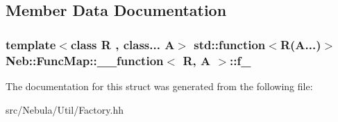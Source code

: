 \subsection{\-Member \-Data \-Documentation}
\hypertarget{structNeb_1_1FuncMap_1_1____function_a408af24d4e6d765e0bf92e9cf126e086}{
\subsubsection[{f\-\_\-}]{\setlength{\rightskip}{0pt plus 5cm}template$<$class R , class... \-A$>$ std\-::function$<$\-R(\-A...)$>$ {\bf \-Neb\-::\-Func\-Map\-::\-\_\-\-\_\-function}$<$ \-R, \-A $>$\-::{\bf f\-\_\-}}}\label{structNeb_1_1FuncMap_1_1____function_a408af24d4e6d765e0bf92e9cf126e086}


\-The documentation for this struct was generated from the following file\-:\begin{DoxyCompactItemize}
\item 
src/\-Nebula/\-Util/\-Factory.\-hh\end{DoxyCompactItemize}
